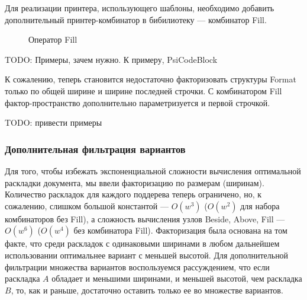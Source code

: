 Для реализации принтера, использующего шаблоны, необходимо добавить
дополнительный принтер-комбинатор в бибилиотеку --- комбинатор Fill.

\begin{figure}[h!]
  \centering
	\quad
	\caption{Оператор Fill}
\end{figure}

TODO: Примеры, зачем нужно. К примеру, PsiCodeBlock

К сожалению, теперь становится недостаточно факторизовать структуры Format
только по общей ширине и ширине последней строчки.
С комбинатором Fill фактор-пространство дополнительно параметризуется и первой
строчкой.

TODO: привести примеры

\subsubsection{Дополнительная фильтрация вариантов}

Для того, чтобы избежать экспоненциальной сложности вычисления оптимальной
раскладки документа, мы ввели факторизацию по размерам (ширинам).
Количество раскладок для каждого поддерева теперь ограничено, но, к сожалению,
слишком большой константой --- $O(w^3)$ ($O(w^2)$ для набора комбинаторов без
Fill), а сложность вычисления узлов Beside, Above, Fill --- $O(w^6)$
($O(w^4)$ без комбинатора Fill). Факторизация была основана на том факте, что
среди раскладок с одинаковыми ширинами в любом дальнейшем использовании
оптимальнее вариант с меньшей высотой. Для дополнительной фильтрации множества
вариантов воспользуемся рассуждением, что если раскладка $A$ обладает и
меньшими ширинами, и меньшей высотой, чем раскладка $B$, то, как и раньше,
достаточно оставить только ее во множестве вариантов.


